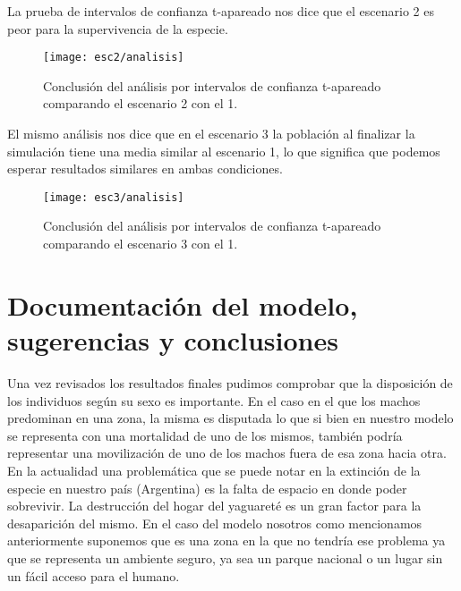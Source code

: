             La prueba de intervalos de confianza t-apareado nos dice que el escenario 2 es peor para la supervivencia de la especie.

            \begin{figure}[H]
                \centering
                \texttt{[image: esc2/analisis]}
                \caption{Conclusión del análisis por intervalos de confianza t-apareado comparando el escenario 2 con el 1.}
                \label{fig:esc2-analisis}
            \end{figure}

            El mismo análisis nos dice que en el escenario 3 la población al finalizar la simulación tiene una media
            similar al escenario 1, lo que significa que podemos esperar resultados similares en ambas condiciones.

            \begin{figure}[H]
                \centering
                \texttt{[image: esc3/analisis]}
                \caption{Conclusión del análisis por intervalos de confianza t-apareado comparando el escenario 3 con el 1.}
                \label{fig:esc3-analisis}
            \end{figure}

            
\section{Documentación del modelo, sugerencias y conclusiones}
  Una vez revisados los resultados finales pudimos comprobar que la disposición de los individuos según su sexo es importante. En el caso en el que los machos predominan en una zona, la misma es disputada lo que si bien en nuestro modelo se representa con una mortalidad de uno de los mismos, también podría representar una movilización de uno de los machos fuera de esa zona hacia otra. En la actualidad una problemática que se puede notar en la extinción de la especie en nuestro país (Argentina) es la falta de espacio en donde poder sobrevivir. La destrucción del hogar del yaguareté es un gran factor para la desaparición del mismo. En el caso del modelo nosotros como mencionamos anteriormente suponemos que es una zona en la que no tendría ese problema ya que se representa un ambiente seguro, ya sea un parque nacional o un lugar sin un fácil acceso para el humano.


